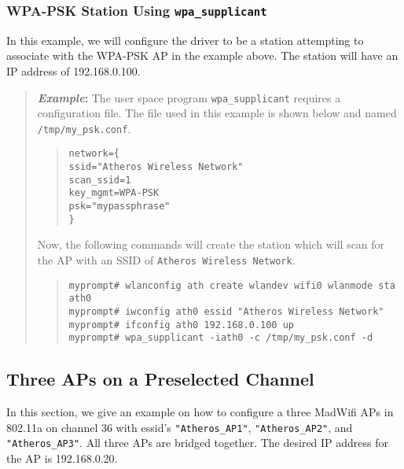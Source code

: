 \documentclass[10pt,fullpage]{article}
\newcommand{\mytt}[1]{{\texttt{#1}}}
\newcommand{\bv}{\begin{verse}}
\newcommand{\ev}{\end{verse}}
\newcommand{\cmd}[1]{{\texttt{myprompt\# #1}}}
\newenvironment{example}{\begin{quote}\textbf{\textit{Example}:}}{\end{quote}}
\begin{document}
\subsubsection{WPA-PSK Station Using \mytt{wpa\_supplicant}}
In this example, we will configure the driver to be a station
attempting to associate with the WPA-PSK AP in the example above.  The
station will have an IP address of 192.168.0.100.
\begin{example}
  The user space program \mytt{wpa\_supplicant} requires a
  configuration file.  The file used in this example is shown below
  and named \mytt{/tmp/my\_psk.conf}.
  \bv
  \mytt{network=\{}\\
  \mytt{\hspace{30pt}ssid="Atheros Wireless Network"}\\
  \mytt{\hspace{30pt}scan\_ssid=1}\\
  \mytt{\hspace{30pt}key\_mgmt=WPA-PSK}\\
  \mytt{\hspace{30pt}psk="mypassphrase"}\\
  \mytt{\}}
  \ev
  Now, the following commands will create the station which will scan
  for the AP with an SSID of \mytt{Atheros Wireless Network}.
  \bv
  \cmd{wlanconfig ath create wlandev wifi0 wlanmode sta}\\
  \mytt{ath0}\\
  \cmd{iwconfig ath0 essid "Atheros Wireless Network"}\\
  \cmd{ifconfig ath0 192.168.0.100 up}\\
  \cmd{wpa\_supplicant -iath0 -c /tmp/my\_psk.conf -d}
  \ev
\end{example}

\subsection{Three APs on a Preselected Channel}
In this section, we give an example on how to configure a three
MadWifi APs in 802.11a on channel 36 with essid's
\mytt{"Atheros\_AP1"}, \mytt{"Atheros\_AP2"}, and
\mytt{"Atheros\_AP3"}. All three APs are bridged together.  The
desired IP address for the AP is 192.168.0.20.
\end{document}
